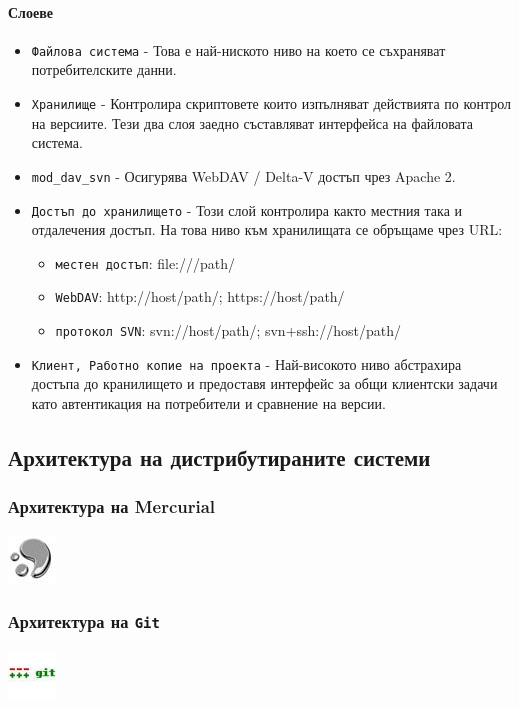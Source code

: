 \documentclass[a4paper]{article}
\def\git{\texttt{Git}}
\begin{document}
    \paragraph{Слоеве}

    \begin{itemize}
      \item \texttt{Файлова система} - Това е най-ниското ниво на което се съхраняват потребителските данни.
      \item \texttt{Хранилище} - Контролира скриптовете които изпълняват действията по контрол на версиите. Тези два слоя заедно съставляват интерфейса на файловата система.
      \item \texttt{mod\_dav\_svn} - Осигурява WebDAV / Delta-V достъп чрез Apache 2.
      \item \texttt{Достъп до хранилището} - Този слой контролира както местния така и отдалечения достъп. На това ниво към хранилищата се обръщаме чрез URL:
        \begin{itemize}
          \item \texttt{местен достъп}: file:///path/
          \item \texttt{WebDAV}: http://host/path/; https://host/path/
          \item \texttt{протокол SVN}: svn://host/path/; svn+ssh://host/path/
        \end{itemize}
      \item \texttt{Клиент, Работно копие на проекта} - Най-високото ниво абстрахира достъпа до кранилището и предоставя интерфейс за общи клиентски задачи като автентикация на потребители и сравнение на версии.
    \end{itemize}

  \subsection{Архитектура на дистрибутираните системи}

    \subsubsection{Архитектура на Mercurial}
    \includegraphics[scale=1.0]{hg_icon}

    \subsubsection{Архитектура на \git}
    \includegraphics[scale=1.0]{git_icon}
\end{document}
